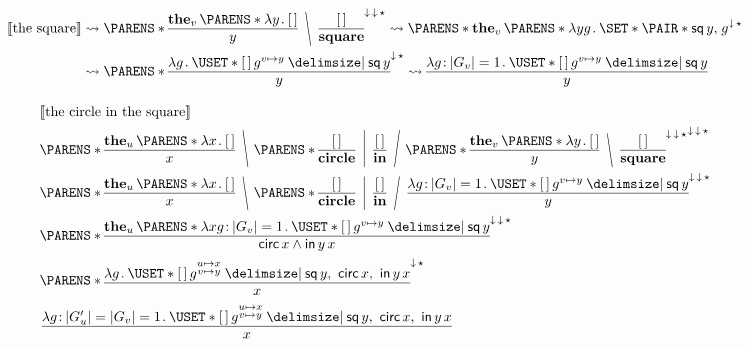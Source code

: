 \documentclass[10pt,fleqn]{article}
\begin{document}
\begin{minipage}[t]{0.6\textwidth}
\begin{align*}
  \sv{\textrm{the square}}
  &\leadsto
  \p{%
    \bitt{\textbf{the}_v\,\p{\l y \dt \hole}}{y}
    \BSL{%
    \bitt{\hole}{\textbf{square}}
    }
  }^{\dnar\,\dnar\,{\bind}}
  \leadsto
  \p{%
    \textbf{the}_v\,\p{\l yg \dt \set{\pair{\cn{sq}\,y}{g}}}
  }^{\dnar\,{\bind}} \\
  &\leadsto
  \p{%
    \bitt{\l g \dt \uset{\hole\,g^{v\mapsto y} \giv \cn{sq}\,y}}{y}
  }^{\dnar\,{\bind}}
  \leadsto
  \bitt{%
    \l g \col |G_v| = 1 \dt \uset{\hole\,g^{v\mapsto y} \giv \cn{sq}\,y}
  }{y}
\end{align*}

\bigskip\bigskip

\begin{align*}
  &
  \sv{\textrm{the circle in the square}} \\
  &
  \p{%
    \bitt{\textbf{the}_u\,\p{\l x \dt \hole}}{x}
    \BSL{%
    \p{%
      \bitt{\hole}{\textbf{circle}}
      \MSL{%
      \bitt{\hole}{\textbf{in}}
      \FSL{%
      \p{%
        \bitt{\textbf{the}_v\,\p{\l y \dt \hole}}{y}
        \BSL{%
        \bitt{\hole}{\textbf{square}}
        }
      }^{\dnar\,\dnar\,{\bind}} } }
    } }
  }^{\dnar\,\dnar\,{\bind}} \\
  &
  \p{%
    \bitt{\textbf{the}_u\,\p{\l x \dt \hole}}{x}
    \BSL{%
    \p{%
      \bitt{\hole}{\textbf{circle}}
      \MSL{%
      \bitt{\hole}{\textbf{in}}
      \FSL{%
      \bitt{%
        \l g \col |G_v| = 1 \dt \uset{\hole\,g^{v\mapsto y} \giv \cn{sq}\,y}
      }{y}
      } }
    } }
  }^{\dnar\,\dnar\,{\bind}} \\
  &
  \p{%
    \bitt{%
      \textbf{the}_u\,\p{%
        \l xg \col |G_v| = 1 \dt \uset{\hole\,g^{v\mapsto y} \giv \cn{sq}\,y}
      }
    }{%
      \cn{circ}\,x \land \cn{in}\,y\,x
    }
  }^{\dnar\,\dnar\,{\bind}} \\
  &
  \p{%
    \bitt{%
      \l g \dt
        \uset{%
          \hole\,g^{\substack{u\mapsto x\\ v\mapsto y}}
        \giv
          \cn{sq}\,y,\ \cn{circ}\,x,\ \cn{in}\,y\,x
        }
    }{x}
  }^{\dnar\,{\bind}} \\
  &
  \bitt{%
    \l g \col |G'_u| = |G_v| = 1 \dt
      \uset{%
        \hole\,g^{\substack{u\mapsto x\\ v\mapsto y}}
      \giv
        \cn{sq}\,y,\ \cn{circ}\,x,\ \cn{in}\,y\,x
      }
  }{x}
\end{align*}
\end{minipage}
\end{document}
